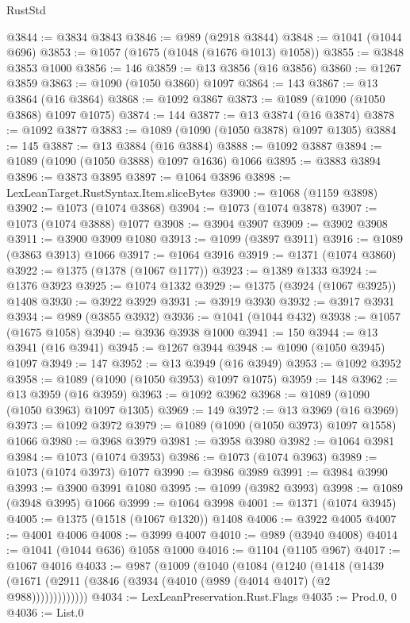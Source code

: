 \begin{lexlean}{RustStd}
\begin{coremodule}
@3844 := @3834 @3843
@3846 := @989 (@2918 @3844)
@3848 := @1041 (@1044 @696)
@3853 := @1057 (@1675 (@1048 (@1676 @1013) @1058))
@3855 := @3848 @3853 @1000
@3856 := 146
@3859 := @13 @3856 (@16 @3856)
@3860 := @1267 @3859
@3863 := @1090 (@1050 @3860) @1097
@3864 := 143
@3867 := @13 @3864 (@16 @3864)
@3868 := @1092 @3867
@3873 := @1089 (@1090 (@1050 @3868) @1097 @1075)
@3874 := 144
@3877 := @13 @3874 (@16 @3874)
@3878 := @1092 @3877
@3883 := @1089 (@1090 (@1050 @3878) @1097 @1305)
@3884 := 145
@3887 := @13 @3884 (@16 @3884)
@3888 := @1092 @3887
@3894 := @1089 (@1090 (@1050 @3888) @1097 @1636) @1066
@3895 := @3883 @3894
@3896 := @3873 @3895
@3897 := @1064 @3896
@3898 := LexLeanTarget.RustSyntax.Item.sliceBytes
@3900 := @1068 (@1159 @3898)
@3902 := @1073 (@1074 @3868)
@3904 := @1073 (@1074 @3878)
@3907 := @1073 (@1074 @3888) @1077
@3908 := @3904 @3907
@3909 := @3902 @3908
@3911 := @3900 @3909 @1080
@3913 := @1099 (@3897 @3911)
@3916 := @1089 (@3863 @3913) @1066
@3917 := @1064 @3916
@3919 := @1371 (@1074 @3860)
@3922 := @1375 (@1378 (@1067 @1177))
@3923 := @1389 @1333
@3924 := @1376 @3923
@3925 := @1074 @1332
@3929 := @1375 (@3924 (@1067 @3925)) @1408
@3930 := @3922 @3929
@3931 := @3919 @3930
@3932 := @3917 @3931
@3934 := @989 (@3855 @3932)
@3936 := @1041 (@1044 @432)
@3938 := @1057 (@1675 @1058)
@3940 := @3936 @3938 @1000
@3941 := 150
@3944 := @13 @3941 (@16 @3941)
@3945 := @1267 @3944
@3948 := @1090 (@1050 @3945) @1097
@3949 := 147
@3952 := @13 @3949 (@16 @3949)
@3953 := @1092 @3952
@3958 := @1089 (@1090 (@1050 @3953) @1097 @1075)
@3959 := 148
@3962 := @13 @3959 (@16 @3959)
@3963 := @1092 @3962
@3968 := @1089 (@1090 (@1050 @3963) @1097 @1305)
@3969 := 149
@3972 := @13 @3969 (@16 @3969)
@3973 := @1092 @3972
@3979 := @1089 (@1090 (@1050 @3973) @1097 @1558) @1066
@3980 := @3968 @3979
@3981 := @3958 @3980
@3982 := @1064 @3981
@3984 := @1073 (@1074 @3953)
@3986 := @1073 (@1074 @3963)
@3989 := @1073 (@1074 @3973) @1077
@3990 := @3986 @3989
@3991 := @3984 @3990
@3993 := @3900 @3991 @1080
@3995 := @1099 (@3982 @3993)
@3998 := @1089 (@3948 @3995) @1066
@3999 := @1064 @3998
@4001 := @1371 (@1074 @3945)
@4005 := @1375 (@1518 (@1067 @1320)) @1408
@4006 := @3922 @4005
@4007 := @4001 @4006
@4008 := @3999 @4007
@4010 := @989 (@3940 @4008)
@4014 := @1041 (@1044 @636) @1058 @1000
@4016 := @1104 (@1105 @967)
@4017 := @1067 @4016
@4033 := @987
    (@1009
      (@1040
        (@1084
          (@1240
            (@1418
              (@1439 (@1671 (@2911 (@3846 (@3934 (@4010 (@989 (@4014 @4017) (@2 @988)))))))))))))
@4034 := LexLeanPreservation.Rust.Flags
@4035 := Prod.{0, 0}
@4036 := List.{0}

\end{coremodule}
\end{lexlean}
